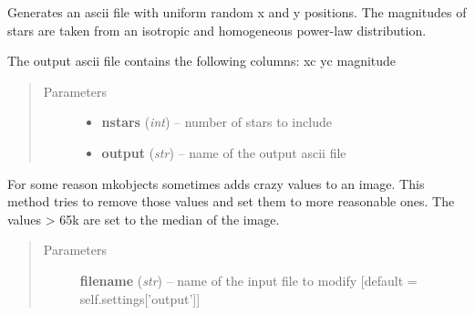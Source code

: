 \documentclass[a4paper,11pt,english]{sphinxmanual}
\begin{document}
\begin{fulllineitems}
\begin{fulllineitems}
\begin{quote}
\begin{description}
\end{description}\end{quote}

\end{fulllineitems}


\begin{fulllineitems}
\label{simulator:simulator.generateGalaxies.generateFakeData.createStarlist}
Generates an ascii file with uniform random x and y positions.
The magnitudes of stars are taken from an isotropic and homogeneous power-law distribution.

The output ascii file contains the following columns: xc yc magnitude
\begin{quote}\begin{description}
\item[{Parameters}] \leavevmode\begin{itemize}
\item {} 
\textbf{nstars} (\emph{int}) -- number of stars to include

\item {} 
\textbf{output} (\emph{str}) -- name of the output ascii file

\end{itemize}

\end{description}\end{quote}

\end{fulllineitems}


\begin{fulllineitems}
\label{simulator:simulator.generateGalaxies.generateFakeData.maskCrazyValues}
For some reason mkobjects sometimes adds crazy values to an image.
This method tries to remove those values and set them to more reasonable ones.
The values \textgreater{} 65k are set to the median of the image.
\begin{quote}\begin{description}
\item[{Parameters}] \leavevmode
\textbf{filename} (\emph{str}) -- name of the input file to modify {[}default = self.settings{[}'output'{]}{]}


\end{description}
\end{quote}
\end{fulllineitems}
\end{fulllineitems}
\end{document}
